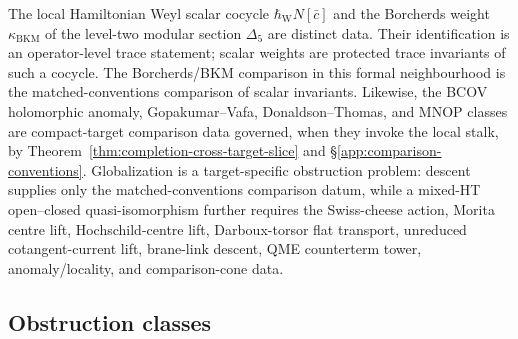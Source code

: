 \begin{rmk}
\label{rmk:completion-modular-bkm}
The local Hamiltonian Weyl scalar cocycle \(\hbar_{\mathrm{W}}N[\bar c]\) and the
Borcherds weight \(\kappa_{\mathrm{BKM}}\) of the level-two modular
section \(\Delta_5\) are distinct data.  Their identification is an
operator-level trace statement; scalar weights are protected trace
invariants of such a cocycle.  The Borcherds/BKM comparison in this formal
neighbourhood is the matched-conventions comparison of scalar invariants.
Likewise, the BCOV holomorphic anomaly, Gopakumar--Vafa,
Donaldson--Thomas, and MNOP classes are compact-target comparison data
governed, when they invoke the local stalk, by
Theorem~\ref{thm:completion-cross-target-slice} and
\S\ref{app:comparison-conventions}.  Globalization is a target-specific
obstruction problem: descent supplies only the matched-conventions
comparison datum, while a mixed-HT open--closed quasi-isomorphism further
requires the Swiss-cheese action, Morita centre lift,
Hochschild-centre lift, Darboux-torsor flat transport, unreduced
cotangent-current lift, brane-link descent, QME counterterm tower,
anomaly/locality, and comparison-cone data.
\end{rmk}

\subsection{Obstruction classes}
\label{ssec:completion-summary}

